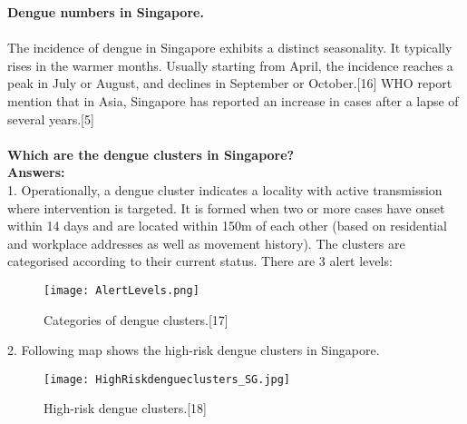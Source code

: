 \documentclass[11pt]{exam}
\begin{document}
\begin{questions}
%
%

\textbf{Dengue numbers in Singapore.} \\ \\
The incidence of dengue in Singapore exhibits a distinct seasonality. It typically rises in the warmer months. Usually starting from April, the incidence reaches a peak in July or August, and declines in September or October.[16] 
WHO report mention that in Asia, Singapore has reported an increase in cases after a lapse of several years.[5]\\ \\ 
\question
\label{15. Dengue: Hotspots in Singapore}
\textbf{Which are the dengue clusters in Singapore?} \\
\textbf{Answers:}\\
1. Operationally, a dengue cluster indicates a locality with active transmission where intervention is targeted.  It is formed when two or more cases have onset within 14 days and are located within 150m of each other (based on residential and workplace addresses as well as movement history). The clusters are categorised according to their current status. There are 3 alert levels:
\begin{figure}[H]
  \centering
   \texttt{[image: AlertLevels.png]}
  \caption{Categories of dengue clusters.[17]}
   \label{fig:Categories of dengue clusters. }
\end{figure} 

2. Following map shows the high-risk dengue clusters in Singapore.
\begin{figure}[H]
  \centering
   \texttt{[image: HighRiskdengueclusters\_SG.jpg]}
  \caption{High-risk dengue clusters.[18]}
   \label{fig:High-risk dengue clusters. }
\end{figure} 


\end{questions}
\end{document}
